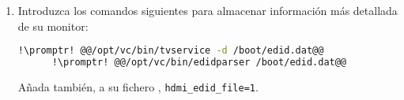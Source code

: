 \begin{enumerate}[resume]
  \item Introduzca los comandos siguientes para almacenar información más detallada de su monitor:
    \begin{lstlisting}[gobble=6,language=bash,style=bashinteract,escapechar=!]
      !\promptr! @@/opt/vc/bin/tvservice -d /boot/edid.dat@@
      !\promptr! @@/opt/vc/bin/edidparser /boot/edid.dat@@
    \end{lstlisting}
  Añada también, a su fichero , \lstinline!hdmi_edid_file=1!.
\end{enumerate}
